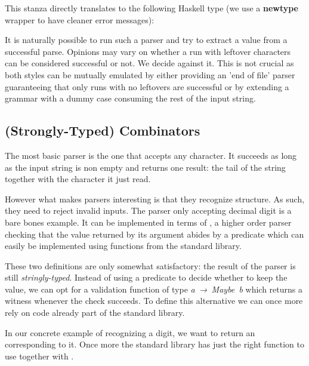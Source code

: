 This stanza directly translates to the following Haskell type (we
use a \textbf{newtype} wrapper to have cleaner error messages):


It is naturally possible to run such a parser and try to extract
a value from a successful parse. Opinions may vary on whether a
run with leftover characters can be considered successful or not.
We decide against it. This is not crucial as both styles can be
mutually emulated by either providing an 'end of file' parser
guaranteeing that only runs with no leftovers are successful or
by extending a grammar with a dummy case consuming the rest of
the input string.


\subsection{(Strongly-Typed) Combinators}

The most basic parser is the one that accepts any character.
It succeeds as long as the input string is non empty and
returns one result: the tail of the string together with the
character it just read.


However what makes parsers interesting is that they recognize
structure. As such, they need to reject invalid inputs. The
parser only accepting decimal digit is a bare bones example.
It can be implemented in terms of , a higher
order parser checking that the value returned by its argument
abides by a predicate which can easily be implemented using
functions from the standard library.


These two definitions are only somewhat satisfactory: the
result of the  parser is still \emph{stringly-typed}.
Instead of using a predicate to decide whether to keep the
value, we can opt for a validation function of type
\mbox{\textit{a → Maybe b}} which returns
a witness whenever the check succeeds. To define this
alternative  we can once more rely on code
already part of the standard library.

In our concrete example of recognizing a digit, we want to
return an  corresponding to it. Once more the
standard library has just the right function to use together
with .



